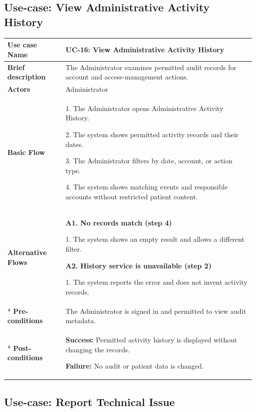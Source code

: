 \clearpage
\subsection{Use-case: View Administrative Activity History}
\label{uc:uc-16}

\begin{longtable}{|p{}|p{}|}
\hline
\textbf{Use case Name} & UC-16: View Administrative Activity History \\ \hline
\textbf{Brief description} & The Administrator examines permitted audit records for account and access-management actions. \\ \hline
\textbf{Actors} & Administrator \\ \hline
\textbf{Basic Flow} &
1. The Administrator opens Administrative Activity History.\par
2. The system shows permitted activity records and their dates.\par
3. The Administrator filters by date, account, or action type.\par
4. The system shows matching events and responsible accounts without restricted patient content.
\\ \hline
\textbf{Alternative Flows} &
\textbf{A1. No records match (step 4)}\par
1. The system shows an empty result and allows a different filter.
\par
\textbf{A2. History service is unavailable (step 2)}\par
1. The system reports the error and does not invent activity records.
\\* \hline
\textbf{Pre-conditions} & The Administrator is signed in and permitted to view audit metadata. \\* \hline
\textbf{Post-conditions} & \textbf{Success:} Permitted activity history is displayed without changing the records.\par
\textbf{Failure:} No audit or patient data is changed. \\ \hline
\end{longtable}


\clearpage
\subsection{Use-case: Report Technical Issue}
\label{uc:uc-17}

